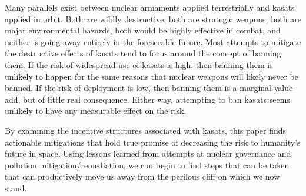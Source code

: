 Many parallels exist between nuclear armaments applied terrestrially
and \acp{kasat} applied in orbit.  Both are wildly destructive, both
are strategic weapons, both are major environmental hazards, both
would be highly effective in combat, and neither is going away
entirely in the foreseeable future.  Most attempts to mitigate the
destructive effects of \acp{kasat} tend to focus around the concept of
banning them.  If the risk of widespread use of \acp{kasat} is high,
then banning them is unlikely to happen for the same reasons that
nuclear weapons will likely never be banned.  If the risk of
deployment is low, then banning them is a marginal value-add, but of
little real consequence.  Either way, attempting to ban \acp{kasat}
seems unlikely to have any measurable effect on the risk.

By examining the incentive structures associated with \acp{kasat},
this paper finds actionable mitigations that hold true promise of
decreasing the risk to humanity's future in space.  Using lessons
learned from attempts at nuclear governance and pollution
mitigation/remediation, we can begin to find steps that can be taken
that can productively move us away from the perilous cliff on which we
now stand.
